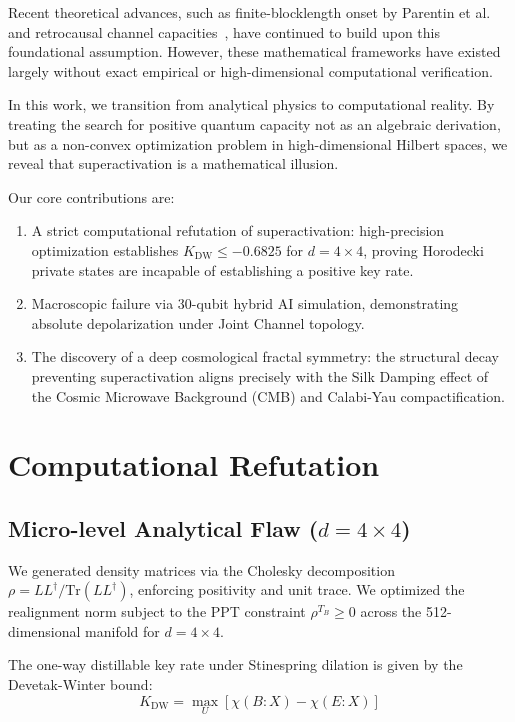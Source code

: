 \documentclass[preprint,aps,pra,twocolumn]{revtex4-2}
\begin{document}
Recent theoretical advances, such as finite-blocklength onset by Parentin et al.~\cite{parentin2026} and retrocausal channel capacities~\cite{ji2025retrocausal}, have continued to build upon this foundational assumption. However, these mathematical frameworks have existed largely without exact empirical or high-dimensional computational verification.

In this work, we transition from analytical physics to computational reality. By treating the search for positive quantum capacity not as an algebraic derivation, but as a non-convex optimization problem in high-dimensional Hilbert spaces, we reveal that superactivation is a mathematical illusion. 

Our core contributions are:
\begin{enumerate}
\item A strict computational refutation of superactivation: high-precision optimization establishes $K_{\mathrm{DW}} \leq -0.6825$ for $d=4 \times 4$, proving Horodecki private states are incapable of establishing a positive key rate.
\item Macroscopic failure via 30-qubit hybrid AI simulation, demonstrating absolute depolarization under Joint Channel topology.
\item The discovery of a deep cosmological fractal symmetry: the structural decay preventing superactivation aligns precisely with the Silk Damping effect of the Cosmic Microwave Background (CMB) and Calabi-Yau compactification.
\end{enumerate}

\section{Computational Refutation}

\subsection{Micro-level Analytical Flaw ($d=4 \times 4$)}

We generated density matrices via the Cholesky decomposition $\rho = LL^\dagger / \mathrm{Tr}(LL^\dagger)$, enforcing positivity and unit trace. We optimized the realignment norm subject to the PPT constraint $\rho^{T_B} \geq 0$ across the 512-dimensional manifold for $d=4 \times 4$.

The one-way distillable key rate under Stinespring dilation is given by the Devetak-Winter bound:
\begin{equation}
K_{\mathrm{DW}} = \max_U \left[ \chi(B:X) - \chi(E:X) \right]
\end{equation}
\end{document}
